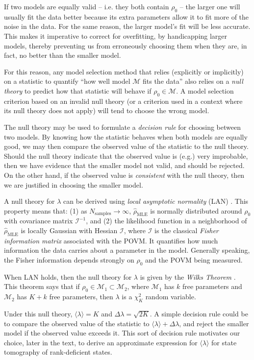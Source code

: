 \documentclass[aps,pra, twocolumn]{revtex4-1}
\newcommand{\M}{\mathcal{M}}
\newcommand{\Fi}{\mathcal{I}}
\newcommand{\rhohat}{\hat{\rho}}
\newcommand{\rhoMLE}{\rhohat_{\scriptscriptstyle\mathrm{MLE}}}
\begin{document}
If two models are equally valid -- i.e. they both contain $\rho_0$ -- the larger one will usually fit the data better because its extra parameters allow it to fit more of the noise in the data.  For the same reason, the larger model's fit will be less accurate.  This makes it imperative to correct for overfitting, by handicapping larger models, thereby preventing us from erroneously choosing them when they are, in fact, no better than the smaller model.

For this reason, any model selection method that relies (explicitly or implicitly) on a statistic to quantify ``how well model $\M$ fits the data'' also relies on a \emph{null theory} to predict how that statistic will behave if $\rho_{0} \in \M$.  A model selection criterion based on an invalid null theory (or a criterion used in a context where its null theory does not apply) will tend to choose the wrong model.

The null theory may be used to formulate a \emph{decision rule} for choosing between two models. By knowing how the statistic behaves when both models are equally good, we may then compare the observed value of the statistic to the null theory. Should the null theory indicate that the observed value is (e.g.) very improbable, then we have evidence that the smaller model not valid, and should be rejected. On the other hand, if the observed value is \emph{consistent} with the null theory, then we are justified in choosing the smaller model.

A null theory for $\lambda$ can be derived using \emph{local asymptotic normality} (LAN) \cite{LeCam1970, LeCam1956}. This property means that: (1) as $N_{\mathrm{samples}}\rightarrow \infty$,  $\rhoMLE$ is normally distributed around $\rho_{0}$ with covariance matrix $\Fi^{-1}$, and (2) the likelihood function in a neighborhood of $\rhoMLE$ is locally Gaussian with Hessian $\Fi$, where $\Fi$ is the classical \emph{Fisher information matrix} associated with the POVM. It quantifies how much information the data carries about a parameter in the model. Generally speaking, the Fisher information depends strongly on $\rho_{0}$ and the POVM being measured.

When LAN holds, then the null theory for $\lambda$ is given by the \emph{Wilks Theorem} \cite{Wilks1938}. This theorem says that if $\rho_{0}\in \M_{1}\subset \M_{2}$, where $\M_{1}$ has $k$ free parameters and $\M_{2}$ has $K+k$ free parameters, then $ \lambda$ is a $\chi^{2}_{K}$ random variable. 

Under this null theory, $\langle \lambda \rangle = K$ and $\Delta \lambda = \sqrt{2K}$. A simple decision rule could be to compare the observed value of the statistic to $\langle \lambda \rangle + \Delta \lambda$, and reject the smaller model if the observed value exceeds it. This sort of decision rule motivates our choice, later in the text, to derive an approximate expression for $\langle \lambda \rangle$ for state tomography of rank-deficient states. 
\end{document}
